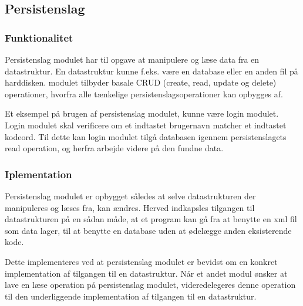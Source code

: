 \subsection{Persistenslag}
\label{sub:persistenslag}

\subsubsection{Funktionalitet}
\label{ssub:persistenslag_funktionalitet}

Persistenslag modulet har til opgave at manipulere og læse data fra en datastruktur. En datastruktur kunne f.eks. være en database eller en anden fil på harddisken. modulet tilbyder basale CRUD (create, read, update og delete) operationer, hvorfra alle tænkelige persistenslagsoperationer kan opbygges af.

Et eksempel på brugen af persistenslag modulet, kunne være login modulet. Login modulet skal verificere om et indtastet brugernavn matcher et indtastet kodeord. Til dette kan login modulet tilgå databasen igennem persistenslagets read operation, og herfra arbejde videre på den fundne data.


\subsubsection{Iplementation}
\label{ssub:persistenslag_implementation}


Persistenslag modulet er opbygget således at selve datastrukturen der manipuleres og læses fra, kan ændres. Herved indkapsles tilgangen til datastrukturen på en sådan måde, at et program kan gå fra at benytte en xml fil som data lager, til at benytte en database uden at ødelægge anden eksisterende kode.

Dette implementeres ved at persistenslag modulet er bevidst om en konkret implementation af tilgangen til en datastruktur. Når et andet modul ønsker at lave en læse operation på persistenslag modulet, videredelegeres denne operation til den underliggende implementation af tilgangen til en datastruktur.
